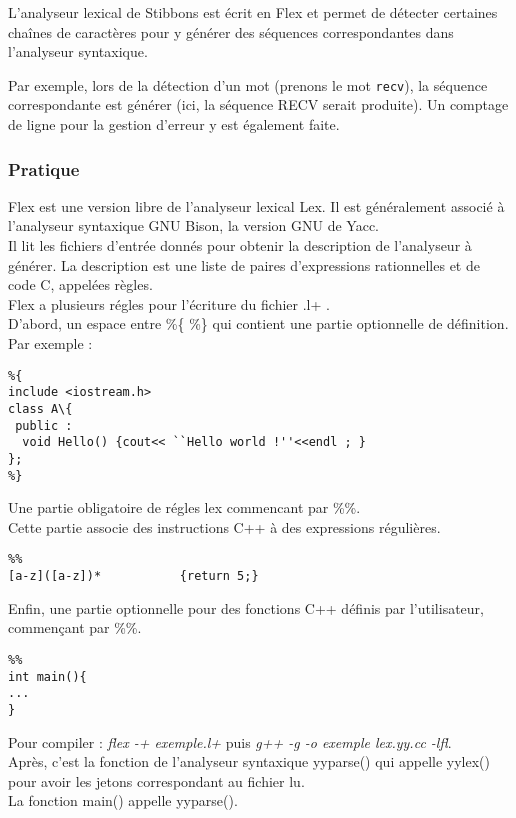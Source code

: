 L'analyseur lexical de Stibbons est écrit en Flex et permet de détecter certaines chaînes de caractères pour y générer des séquences correspondantes dans l'analyseur syntaxique.

Par exemple, lors de la détection d'un mot (prenons le mot \verb|recv|), la séquence correspondante est générer (ici, la séquence RECV serait produite).
Un comptage de ligne pour la gestion d'erreur y est également faite.

\subsubsection{Pratique}
Flex est une version libre de l'analyseur lexical Lex. Il est généralement associé à l'analyseur syntaxique GNU Bison, la version GNU de Yacc. \\
Il lit les fichiers d'entrée donnés pour obtenir la description de l'analyseur à générer. La description est une liste de paires d'expressions rationnelles et de code C, appelées règles. \\
Flex a plusieurs régles pour l'écriture du fichier .l+ .\\
D'abord, un espace entre \%\{ \%\} qui contient une partie optionnelle de définition.\\
Par exemple :
\ \begin{verbatim}
%{
include <iostream.h>
class A\{ 
 public :
  void Hello() {cout<< ``Hello world !''<<endl ; }
};
%}
\end{verbatim}
Une partie obligatoire de régles lex commencant par \%\%.\\
Cette partie associe des instructions C++ à des expressions régulières.
\begin{verbatim}
%%
[a-z]([a-z])*           {return 5;}
\end{verbatim}
Enfin, une partie optionnelle pour des fonctions C++ définis par l'utilisateur, commençant par \%\%.\\
\begin{verbatim}
%%
int main(){
...
}
\end{verbatim}
Pour compiler : \textit{flex -+ exemple.l+}  puis \textit{g++ -g -o exemple lex.yy.cc -lfl}.\\
Après, c'est la fonction de l'analyseur syntaxique yyparse() qui appelle yylex() pour avoir les jetons correspondant au fichier lu.\\
La fonction main() appelle yyparse().\\
